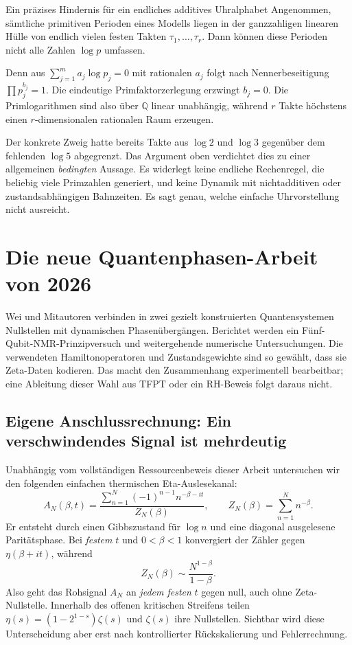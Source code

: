 \Needspace{180pt}
\begin{grenze}{Ein präzises Hindernis für ein endliches additives Uhralphabet}
Angenommen, sämtliche primitiven Perioden eines Modells liegen in der ganzzahligen linearen Hülle von endlich vielen festen Takten $\tau_1,\ldots,\tau_r$. Dann können diese Perioden nicht alle Zahlen $\log p$ umfassen.

Denn aus $\sum_{j=1}^m a_j\log p_j=0$ mit rationalen $a_j$ folgt nach Nennerbeseitigung $\prod p_j^{b_j}=1$. Die eindeutige Primfaktorzerlegung erzwingt $b_j=0$. Die Primlogarithmen sind also über $\mathbb Q$ linear unabhängig, während $r$ Takte höchstens einen $r$-dimensionalen rationalen Raum erzeugen.
\end{grenze}
Der konkrete Zweig hatte bereits Takte aus $\log2$ und $\log3$ gegenüber dem fehlenden $\log5$ abgegrenzt. Das Argument oben verdichtet dies zu einer allgemeinen \emph{bedingten} Aussage. Es widerlegt keine endliche Rechenregel, die beliebig viele Primzahlen generiert, und keine Dynamik mit nichtadditiven oder zustandsabhängigen Bahnzeiten. Es sagt genau, welche einfache Uhrvorstellung nicht ausreicht. 

\section{Die neue Quantenphasen-Arbeit von 2026}
Wei und Mitautoren verbinden in zwei gezielt konstruierten Quantensystemen Nullstellen mit dynamischen Phasenübergängen. Berichtet werden ein Fünf-Qubit-NMR-Prinzipversuch und weitergehende numerische Untersuchungen. Die verwendeten Hamiltonoperatoren und Zustandsgewichte sind so gewählt, dass sie Zeta-Daten kodieren. Das macht den Zusammenhang experimentell bearbeitbar; eine Ableitung dieser Wahl aus TFPT oder ein RH-Beweis folgt daraus nicht. 

\subsection{Eigene Anschlussrechnung: Ein verschwindendes Signal ist mehrdeutig}
Unabhängig vom vollständigen Ressourcenbeweis dieser Arbeit untersuchen wir den folgenden einfachen thermischen Eta-Auslesekanal:
\begin{equation}
 A_N(\beta,t)=\frac{\sum_{n=1}^{N}(-1)^{n-1}n^{-\beta-it}}{Z_N(\beta)},
 \qquad Z_N(\beta)=\sum_{n=1}^{N}n^{-\beta}.
 \label{eq:eta-readout}
\end{equation}
Er entsteht durch einen Gibbszustand für $\log n$ und eine diagonal ausgelesene Paritätsphase. Bei \emph{festem} $t$ und $0<\beta<1$ konvergiert der Zähler gegen $\eta(\beta+it)$, während
\[
 Z_N(\beta)\sim\frac{N^{1-\beta}}{1-\beta}.
\]
Also geht das Rohsignal $A_N$ an \emph{jedem festen} $t$ gegen null, auch ohne Zeta-Nullstelle. Innerhalb des offenen kritischen Streifens teilen $\eta(s)=(1-2^{1-s})\zeta(s)$ und $\zeta(s)$ ihre Nullstellen. Sichtbar wird diese Unterscheidung aber erst nach kontrollierter Rückskalierung und Fehlerrechnung.

